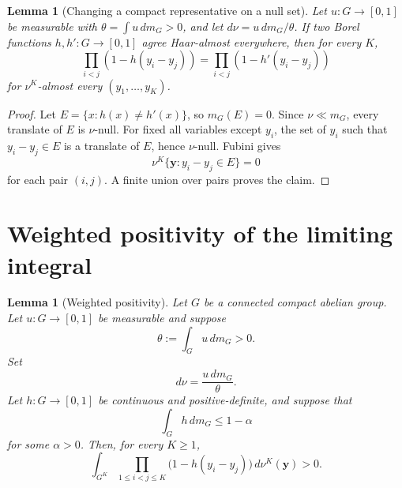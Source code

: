 \documentclass[11pt]{article}
\numberwithin{equation}{section}
\newtheorem{lemma}[theorem]{Lemma}
\newcommand{\1}{\mathbf 1}
\begin{document}
\begin{lemma}[Changing a compact representative on a null set]
\label{lem:null-representative}
Let \(u:G\to[0,1]\) be measurable with \(\theta=\int u\,dm_G>0\), and
let \(d\nu=u\,dm_G/\theta\).  If two Borel functions \(h,h':G\to[0,1]\)
agree Haar-almost everywhere, then for every \(K\),
\[
        \prod_{i<j}(1-h(y_i-y_j))
        =
        \prod_{i<j}(1-h'(y_i-y_j))
\]
for \(\nu^K\)-almost every \((y_1,\ldots,y_K)\).
\end{lemma}

\begin{proof}
Let \(E=\{x:h(x)\ne h'(x)\}\), so \(m_G(E)=0\).  Since \(\nu\ll m_G\),
every translate of \(E\) is \(\nu\)-null.  For fixed all variables except
\(y_i\), the set of \(y_i\) such that \(y_i-y_j\in E\) is a translate of
\(E\), hence \(\nu\)-null.  Fubini gives
\[
        \nu^K\{\mathbf y:y_i-y_j\in E\}=0
\]
for each pair \((i,j)\).  A finite union over pairs proves the claim.
\end{proof}

\section{Weighted positivity of the limiting integral}
\label{sec:weighted-positivity}

\begin{lemma}[Weighted positivity]
\label{lem:weighted-positivity}
Let \(G\) be a connected compact abelian group.  Let \(u:G\to[0,1]\) be
measurable and suppose
\[
        \theta:=\int_G u\,dm_G>0.
\]
Set
\[
        d\nu=\frac{u\,dm_G}{\theta}.
\]
Let \(h:G\to[0,1]\) be continuous and positive-definite, and suppose that
\[
        \int_G h\,dm_G\le1-\alpha
\]
for some \(\alpha>0\).  Then, for every \(K\ge1\),
\[
        \int_{G^K}
        \prod_{1\le i<j\le K}
        \bigl(1-h(y_i-y_j)\bigr)\,d\nu^K(\mathbf y)>0.
\]
\end{lemma}
\end{document}
